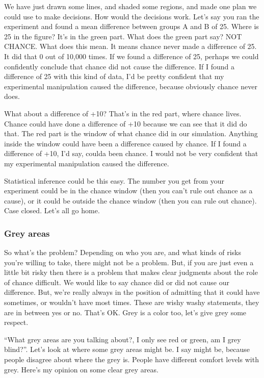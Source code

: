 \documentclass[
]{book}
\begin{document}
We have just drawn some lines, and shaded some regions, and made one plan we could use to make decisions. How would the decisions work. Let's say you ran the experiment and found a mean difference between groups A and B of 25. Where is 25 in the figure? It's in the green part. What does the green part say? NOT CHANCE. What does this mean. It means chance never made a difference of 25. It did that 0 out of 10,000 times. If we found a difference of 25, perhaps we could confidently conclude that chance did not cause the difference. If I found a difference of 25 with this kind of data, I'd be pretty confident that my experimental manipulation caused the difference, because obviously chance never does.

What about a difference of +10? That's in the red part, where chance lives. Chance could have done a difference of +10 because we can see that it did do that. The red part is the window of what chance did in our simulation. Anything inside the window could have been a difference caused by chance. If I found a difference of +10, I'd say, coulda been chance. I would not be very confident that my experimental manipulation caused the difference.

Statistical inference could be this easy. The number you get from your experiment could be in the chance window (then you can't rule out chance as a cause), or it could be outside the chance window (then you can rule out chance). Case closed. Let's all go home.

\subsubsection{Grey areas}\label{grey-areas}

So what's the problem? Depending on who you are, and what kinds of risks you're willing to take, there might not be a problem. But, if you are just even a little bit risky then there is a problem that makes clear judgments about the role of chance difficult. We would like to say chance did or did not cause our difference. But, we're really always in the position of admitting that it could have sometimes, or wouldn't have most times. These are wishy washy statements, they are in between yes or no. That's OK. Grey is a color too, let's give grey some respect.

``What grey areas are you talking about?, I only see red or green, am I grey blind?''. Let's look at where some grey areas might be. I say might be, because people disagree about where the grey is. People have different comfort levels with grey. Here's my opinion on some clear grey areas.
\end{document}
